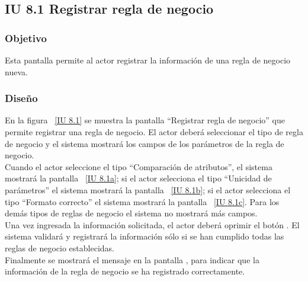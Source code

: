 \subsection{IU 8.1 Registrar regla de negocio}

\subsubsection{Objetivo}
	
	Esta pantalla permite al actor registrar la información de una regla de negocio nueva.

\subsubsection{Diseño}

    En la figura ~\ref{IU 8.1} se muestra la pantalla ``Registrar regla de negocio'' que permite registrar una regla de negocio. El actor deberá 
    seleccionar el tipo de regla de negocio y el sistema mostrará los campos de los parámetros de la regla de negocio. \\
    
    Cuando el actor seleccione el tipo ``Comparación de atributos'', el sistema mostrará la pantalla ~\ref{IU 8.1a}; si el actor selecciona el tipo
    ``Unicidad de parámetros'' el sistema mostrará la pantalla ~\ref{IU 8.1b}; si el actor selecciona el tipo ``Formato correcto'' el sistema
    mostrará la pantalla ~\ref{IU 8.1c}. Para los demás tipos de reglas de negocio el sistema no mostrará más campos.\\
    
    Una vez ingresada la información solicitada, el actor deberá oprimir el botón . El sistema validará y registrará la 
    información sólo si se han cumplido todas las reglas de negocio establecidas.  \\
    
    Finalmente se mostrará el mensaje  en la pantalla , 
    para indicar que la información de la regla de negocio
    se ha registrado correctamente.        




